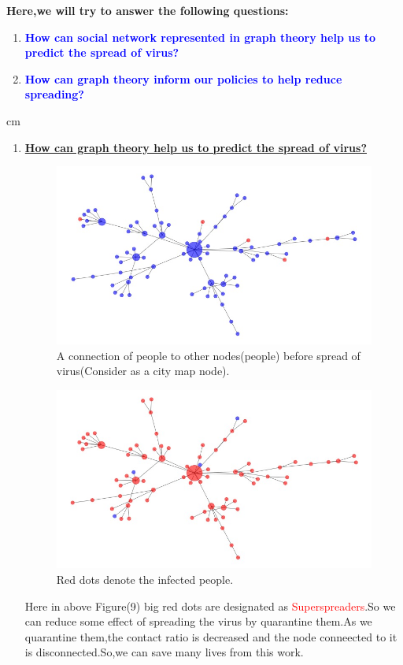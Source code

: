 \documentclass[12pt]{article}
\begin{document}
\par{ \bf{Here,we will try to answer the following questions:}\\
\begin{enumerate}
\item\textcolor{blue}{\bf {How can social network represented in graph theory help us to predict the spread of virus?}}
\item\textcolor{blue} {\bf{ How can graph theory inform our policies to help reduce spreading?}}
\end{enumerate}
 cm
\begin{enumerate}
\item{\bf\underline{ How can graph theory help us to predict the spread of virus?}}
\begin{figure}[H]
\includegraphics[width=\textwidth]{Socially.jpeg}
\caption{A connection of people to other nodes(people) before spread of virus(Consider as a city map node).\cite{nj7}} 
\end{figure}
\begin{figure}[H]
\includegraphics[width=\textwidth]{Sociallity_2.jpeg}
\caption{Red dots denote the infected people.\cite{nj7}} 
\end{figure}
\par Here in above Figure(9) big red dots are designated as \textcolor{red}{Superspreaders}.So we can reduce some effect of spreading the virus by quarantine them.As we quarantine them,the contact ratio is decreased and the node conneected to it is disconnected.So,we can save many lives from this work.\\


\end{enumerate}}
\end{document}
